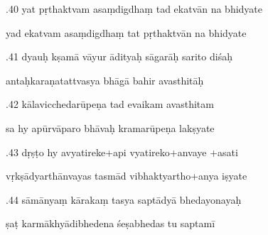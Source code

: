 \documentclass[article,12pt,a4paper]{memoir}%
\newcounter{parCount}
\begin{document}
	  
	  \pstart {}.40 yat pṛthaktvam asaṃdigdhaṃ tad ekatvān na bhidyate 
	{}
	\pend%
      

	  
	  \pstart \leavevmode%
	yad ekatvam asaṃdigdhaṃ tat pṛthaktvān na bhidyate 
	{}
	\pend%
      

	  
	  \pstart {}.41 dyauḥ kṣamā vāyur ādityaḥ sāgarāḥ sarito diśaḥ 
	{}
	\pend%
      

	  
	  \pstart \leavevmode%
	antaḥkaraṇatattvasya bhāgā bahir avasthitāḥ 
	{}
	\pend%
      

	  
	  \pstart {}.42 kālavicchedarūpeṇa tad evaikam avasthitam 
	{}
	\pend%
      

	  
	  \pstart \leavevmode%
	sa hy apūrvāparo bhāvaḥ kramarūpeṇa lakṣyate 
	{}
	\pend%
      

	  
	  \pstart {}.43 dṛṣṭo hy avyatireke+api vyatireko+anvaye +asati 
	{}
	\pend%
      

	  
	  \pstart \leavevmode%
	vṛkṣādyarthānvayas tasmād vibhaktyartho+anya iṣyate 
	{}
	\pend%
      

	  
	  \pstart {}.44 sāmānyaṃ kārakaṃ tasya saptādyā bhedayonayaḥ 
	{}
	\pend%
      

	  
	  \pstart \leavevmode%
	ṣaṭ karmākhyādibhedena śeṣabhedas tu saptamī 
	{}
	\pend%
      
\end{document}
